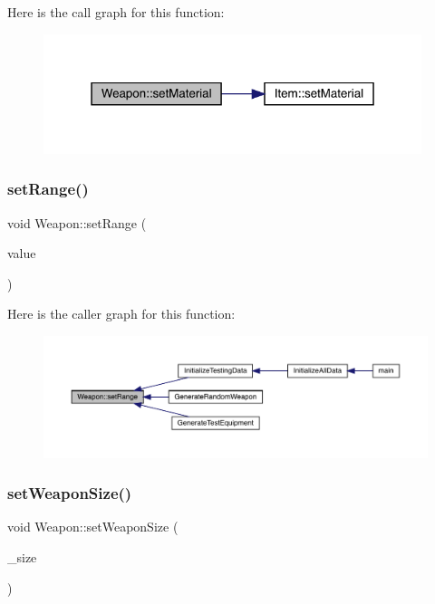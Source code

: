 Here is the call graph for this function\+:
\nopagebreak
\begin{figure}[H]
\begin{center}
\leavevmode
\includegraphics[width=313pt]{db/de5/class_weapon_a2861d732a0cccff20a9ea29548d05702_cgraph}
\end{center}
\end{figure}
\mbox{\label{class_weapon_aa6f690fe5e69ce11628b245739c74dc5}} 
\subsubsection{\texorpdfstring{set\+Range()}{setRange()}}
{\footnotesize\ttfamily void Weapon\+::set\+Range (\begin{DoxyParamCaption}\item[{short int}]{value }\end{DoxyParamCaption})}

Here is the caller graph for this function\+:
\nopagebreak
\begin{figure}[H]
\begin{center}
\leavevmode
\includegraphics[width=350pt]{db/de5/class_weapon_aa6f690fe5e69ce11628b245739c74dc5_icgraph}
\end{center}
\end{figure}
\mbox{\label{class_weapon_a78e4b6c131a25e93f647594191bae38d}} 
\subsubsection{\texorpdfstring{set\+Weapon\+Size()}{setWeaponSize()}}
{\footnotesize\ttfamily void Weapon\+::set\+Weapon\+Size (\begin{DoxyParamCaption}\item[{\mbox{\hyperlink{_weapon_8hpp_a160076f6c574c69cd1ce2b3f42cf3755}{En\+Weapon\+Size}}}]{\+\_\+size }\end{DoxyParamCaption})}

